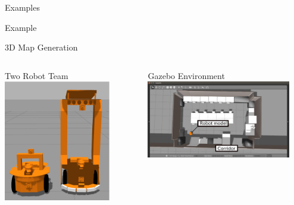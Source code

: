 \documentclass[9pt]{beamer}
\begin{document}
\begin{section}{Examples}
    \begin{frame}{Example}
        \begin{block}{3D Map Generation}
            \begin{columns}
                \begin{column}{0.5\textwidth}
                    \begin{block}{Two Robot Team}
                        \includegraphics[width=0.8\textwidth,trim={0cm 0cm 0cm 0cm},clip]{3-Figure2-1.png}
                    \end{block}
                \end{column}
                \begin{column}{0.5\textwidth}
                    \begin{block}{Gazebo Environment}
                        \includegraphics[width=0.9\textwidth,trim={0cm 0cm 0cm 0cm},clip]{3-Figure3-1.png}

\end{block}
\end{column}
\end{columns}
\end{block}
\end{frame}
\end{section}
\end{document}
